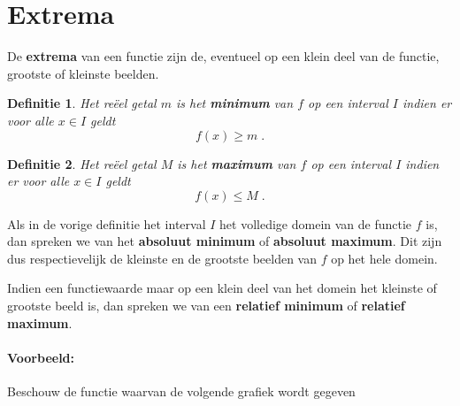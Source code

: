 \documentclass[12pt,twoside]{article}
\newtheorem{definition}{Definitie}
\begin{document}
\newpage

\section{Extrema}

De {\bf extrema} van een functie zijn de, eventueel op een klein deel van de functie, grootste of kleinste beelden.

\begin{definition}
Het reëel getal $m$ is het {\bf minimum} van $f$ op een interval $I$ indien er voor alle $x\in I$ geldt
$$f(x)\geq m\;.$$
\end{definition}

\begin{definition}
Het reëel getal $M$ is het {\bf maximum} van $f$ op een interval $I$ indien er voor alle $x\in I$ geldt
$$f(x)\leq M\;.$$
\end{definition}

Als in de vorige definitie het interval $I$ het volledige domein van de functie $f$ is, dan spreken we van het {\bf absoluut minimum} of {\bf absoluut maximum}. Dit zijn dus respectievelijk de kleinste en de grootste beelden van $f$ op het hele domein.

Indien een functiewaarde maar op een klein deel van het domein het kleinste of grootste beeld is, dan spreken we van een {\bf relatief minimum} of {\bf relatief maximum}.

\paragraph*{Voorbeeld:} Beschouw de functie waarvan de volgende grafiek wordt gegeven

\begin{center}
\end{center}
\end{document}
